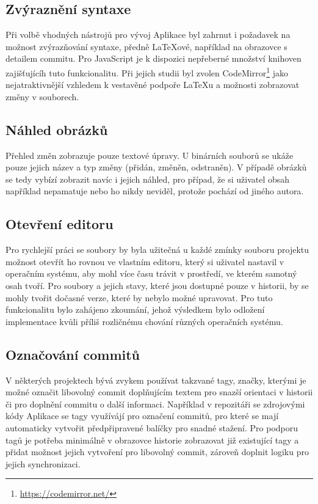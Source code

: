 \subsection{Zvýraznění syntaxe}

Při volbě vhodných nástrojů pro vývoj Aplikace byl zahrnut i požadavek na možnost zvýrazňování syntaxe, předně \LaTeX{ové}, například na obrazovce s detailem commitu. Pro JavaScript je k dispozici nepřeberné množství knihoven zajišťujícíh tuto funkcionalitu. Při jejich studii byl zvolen CodeMirror\footnote{\url{https://codemirror.net/}} jako nejatraktivnější vzhledem k vestavěné podpoře \LaTeX{u} a možnosti zobrazovat změny v souborech.

\subsection{Náhled obrázků}

Přehled změn zobrazuje pouze textové úpravy. U binárních souborů se ukáže pouze jejich název a typ změny (přidán, změněn, odstraněn). V případě obrázků se tedy vybízí zobrazit navíc i jejich náhled, pro případ, že si uživatel obsah například nepamatuje nebo ho nikdy neviděl, protože pochází od jiného autora.

\subsection{Otevření editoru}

Pro rychlejší práci se soubory by byla užitečná u každé zmínky souboru projektu možnost otevřít ho rovnou ve vlastním editoru, který si uživatel nastavil v operačním systému, aby mohl více času trávit v prostředí, ve kterém samotný osah tvoří. Pro soubory a jejich stavy, které jsou dostupné pouze v historii, by se mohly tvořit dočasné verze, které by nebylo možné upravovat. Pro tuto funkcionalitu bylo zahájeno zkoumání, jehož výsledkem bylo odložení implementace kvůli příliš rozličnému chování různých operačních systému.

\subsection{Označování commitů}

V některých projektech bývá zvykem používat takzvané tagy, značky, kterými je možné označit libovolný commit doplňujícím textem pro snazší orientaci v historii či pro doplnění commitu o další informaci. Například v repozitáři se zdrojovými kódy Aplikace se tagy využívájí pro označení commitů, pro které se mají automaticky vytvořit předpřipravené balíčky pro snadné stažení. Pro podporu tagů je potřeba minimálně v obrazovce historie zobrazovat již existující tagy a přidat možnost jejich vytvoření pro libovolný commit, zároveň doplnit logiku pro jejich synchronizaci.

